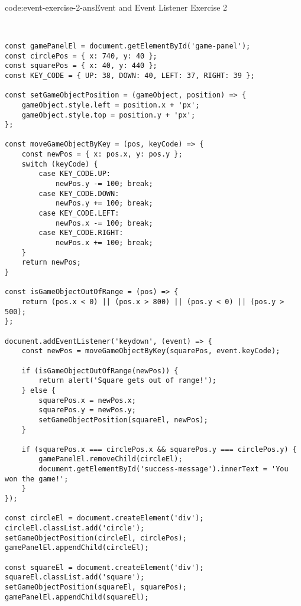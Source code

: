 \begin{codeenv}{code:event-exercise-2-ans}{Event and Event Listener Exercise 2}\begin{verbatim}


const gamePanelEl = document.getElementById('game-panel');
const circlePos = { x: 740, y: 40 };
const squarePos = { x: 40, y: 440 };
const KEY_CODE = { UP: 38, DOWN: 40, LEFT: 37, RIGHT: 39 };

const setGameObjectPosition = (gameObject, position) => {
    gameObject.style.left = position.x + 'px';
    gameObject.style.top = position.y + 'px';
};

const moveGameObjectByKey = (pos, keyCode) => {
    const newPos = { x: pos.x, y: pos.y };
    switch (keyCode) {
        case KEY_CODE.UP:
            newPos.y -= 100; break;
        case KEY_CODE.DOWN:
            newPos.y += 100; break;
        case KEY_CODE.LEFT:
            newPos.x -= 100; break;
        case KEY_CODE.RIGHT:
            newPos.x += 100; break;
    }
    return newPos;
}

const isGameObjectOutOfRange = (pos) => {
    return (pos.x < 0) || (pos.x > 800) || (pos.y < 0) || (pos.y > 500);
};

document.addEventListener('keydown', (event) => {
    const newPos = moveGameObjectByKey(squarePos, event.keyCode);

    if (isGameObjectOutOfRange(newPos)) {
        return alert('Square gets out of range!');
    } else {
        squarePos.x = newPos.x;
        squarePos.y = newPos.y;
        setGameObjectPosition(squareEl, newPos);
    }

    if (squarePos.x === circlePos.x && squarePos.y === circlePos.y) {
        gamePanelEl.removeChild(circleEl);
        document.getElementById('success-message').innerText = 'You won the game!';
    }
});

const circleEl = document.createElement('div');
circleEl.classList.add('circle');
setGameObjectPosition(circleEl, circlePos);
gamePanelEl.appendChild(circleEl);

const squareEl = document.createElement('div');
squareEl.classList.add('square');
setGameObjectPosition(squareEl, squarePos);
gamePanelEl.appendChild(squareEl);
\end{verbatim}
\end{codeenv}

